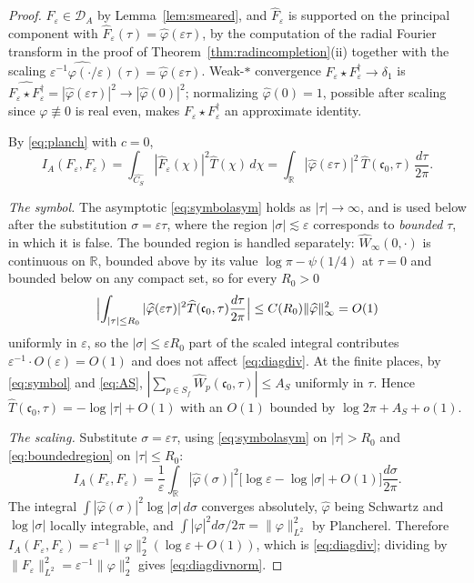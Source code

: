 \documentclass[11pt]{amsart}
\theoremstyle{definition}
\theoremstyle{remark}
\newcommand{\R}{\mathbb R}
\newcommand{\DA}{\mathcal D_A}
\begin{document}
\begin{proof}
$F_\varepsilon\in\DA$ by Lemma~\ref{lem:smeared}, and
$\widehat F_\varepsilon$ is supported on the principal component with
$\widehat F_\varepsilon(\tau)=\widehat\varphi(\varepsilon\tau)$, by the
computation of the radial Fourier transform in the proof of
Theorem~\ref{thm:radincompletion}(ii) together with the scaling
$\widehat{\varepsilon^{-1}\varphi(\cdot/\varepsilon)}(\tau)
=\widehat\varphi(\varepsilon\tau)$. Weak-$*$ convergence
$F_\varepsilon\star F_\varepsilon^\dagger\to\delta_1$ is
$\widehat{F_\varepsilon\star F_\varepsilon^\dagger}
=|\widehat\varphi(\varepsilon\tau)|^2\to|\widehat\varphi(0)|^2$; normalizing
$\widehat\varphi(0)=1$, possible after scaling since $\varphi\not\equiv0$ is
real even, makes $F_\varepsilon\star F_\varepsilon^\dagger$ an approximate
identity.

By \eqref{eq:planch} with $c=0$,
\[
  I_A(F_\varepsilon,F_\varepsilon)
   =\int_{\widehat{C_S}}|\widehat F_\varepsilon(\chi)|^2\widehat T(\chi)\,d\chi
   =\int_\R|\widehat\varphi(\varepsilon\tau)|^2\,
     \widehat T(\mathfrak c_0,\tau)\,\frac{d\tau}{2\pi}.
\]

\emph{The symbol.} The asymptotic \eqref{eq:symbolasym} holds as
$|\tau|\to\infty$, and is used below after the substitution
$\sigma=\varepsilon\tau$, where the region $|\sigma|\lesssim\varepsilon$
corresponds to \emph{bounded} $\tau$, in which it is false. The bounded region
is handled separately: $\widehat W_\infty(0,\cdot)$ is continuous on $\R$,
bounded above by its value $\log\pi-\psi(1/4)$ at $\tau=0$ and bounded below on
any compact set, so for every $R_0>0$
\begin{equation}\label{eq:boundedregion}
  \Bigl|\int_{|\tau|\le R_0}|\widehat\varphi(\varepsilon\tau)|^2
    \widehat T(\mathfrak c_0,\tau)\frac{d\tau}{2\pi}\Bigr|
   \le C(R_0)\|\widehat\varphi\|_\infty^2=O(1)
\end{equation}
uniformly in $\varepsilon$, so the $|\sigma|\le\varepsilon R_0$ part of the
scaled integral contributes $\varepsilon^{-1}\cdot O(\varepsilon)=O(1)$ and does
not affect \eqref{eq:diagdiv}. At the finite places, by \eqref{eq:symbol} and
\eqref{eq:AS}, $|\sum_{p\in S_f}\widehat W_p(\mathfrak c_0,\tau)|\le A_S$
uniformly in $\tau$. Hence
$\widehat T(\mathfrak c_0,\tau)=-\log|\tau|+O(1)$ with an $O(1)$ bounded by
$\log2\pi+A_S+o(1)$.

\emph{The scaling.} Substitute $\sigma=\varepsilon\tau$, using
\eqref{eq:symbolasym} on $|\tau|>R_0$ and \eqref{eq:boundedregion} on
$|\tau|\le R_0$:
\[
  I_A(F_\varepsilon,F_\varepsilon)=\frac1\varepsilon\int_\R
   |\widehat\varphi(\sigma)|^2\bigl[\log\varepsilon-\log|\sigma|+O(1)\bigr]
   \frac{d\sigma}{2\pi}.
\]
The integral $\int|\widehat\varphi(\sigma)|^2\log|\sigma|\,d\sigma$ converges
absolutely, $\widehat\varphi$ being Schwartz and $\log|\sigma|$ locally
integrable, and $\int|\widehat\varphi|^2d\sigma/2\pi=\|\varphi\|_{L^2}^2$ by
Plancherel. Therefore
$I_A(F_\varepsilon,F_\varepsilon)=\varepsilon^{-1}\|\varphi\|_2^2
(\log\varepsilon+O(1))$, which is \eqref{eq:diagdiv}; dividing by
$\|F_\varepsilon\|_{L^2}^2=\varepsilon^{-1}\|\varphi\|_2^2$ gives
\eqref{eq:diagdivnorm}.


\end{proof}
\end{document}

